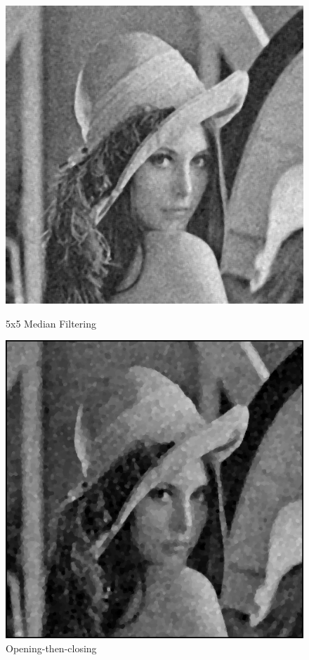 \documentclass{article}
\begin{document}
\begin{figure}[H]
  \includegraphics[width=\linewidth]{img/g30_median_5x5.png}
  \caption{5x5 Median Filtering}\label{fig:g30_median_5x5}
\endminipage\hfill
{}
  \includegraphics[width=\linewidth]{img/g30_open_then_close.png}
  \caption{Opening-then-closing}\label{fig:g30_open_then_close}
\endminipage\hfill
\end{figure}
\end{document}
